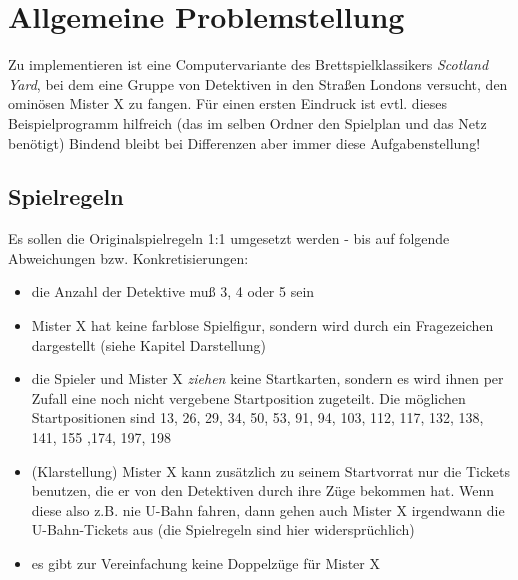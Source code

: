 \chapter{Allgemeine Problemstellung}

    Zu implementieren ist eine Computervariante des Brettspielklassikers \textit{Scotland Yard}, 
    bei dem eine Gruppe von Detektiven in den Straßen Londons versucht, den ominösen Mister X zu fangen.
    Für einen ersten Eindruck ist evtl. dieses Beispielprogramm hilfreich (das im selben Ordner den Spielplan und das Netz benötigt)
    Bindend bleibt bei Differenzen aber immer diese Aufgabenstellung!
  
    \section{Spielregeln}
        Es sollen die Originalspielregeln 1:1 umgesetzt werden - bis auf folgende Abweichungen bzw. Konkretisierungen:
        \begin{itemize}
            \item die Anzahl der Detektive muß 3, 4 oder 5 sein
            \item Mister X hat keine farblose Spielfigur, sondern wird durch ein Fragezeichen dargestellt (siehe Kapitel Darstellung)
            \item die Spieler und Mister X \textit{ziehen} keine Startkarten, sondern es wird ihnen per Zufall eine noch nicht vergebene Startposition zugeteilt. Die möglichen Startpositionen sind 13, 26, 29, 34, 50, 53, 91, 94, 103, 112, 117, 132, 138, 141, 155 ,174, 197, 198
            \item (Klarstellung) Mister X kann zusätzlich zu seinem Startvorrat nur die Tickets benutzen, die er von den Detektiven durch ihre Züge bekommen hat. Wenn diese also z.B. nie U-Bahn fahren, dann gehen auch Mister X irgendwann die U-Bahn-Tickets aus (die Spielregeln sind hier widersprüchlich)
            \item es gibt zur Vereinfachung keine Doppelzüge für Mister X
        \end{itemize}

